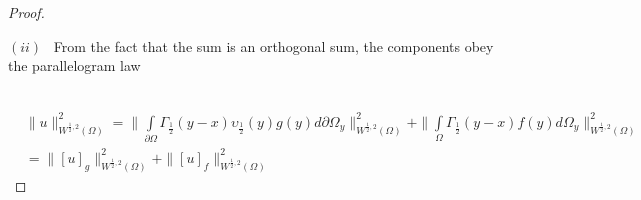 \documentclass[10pt,a4paper]{amsart}
\numberwithin{equation}{section}
\begin{document}
\begin{proof}
\ 

$\left(  ii\right)  $ \ From the fact that the sum is an orthogonal sum, the
components obey the parallelogram law

\
\begin{align*}
& \parallel u\parallel_{W^{\frac{1}{2},2}\left(  \Omega\right)  }%
^{2}=\parallel%
{\displaystyle\int\limits_{\partial\Omega}}
\Gamma_{\frac{1}{2}}\left(  y-x\right)  \upsilon_{\frac{1}{2}}\left(
y\right)  g(y)d\partial\Omega_{y}\parallel_{W^{\frac{1}{2},2}\left(
\Omega\right)  }^{2}+\parallel%
{\displaystyle\int\limits_{\Omega}}
\Gamma_{\frac{1}{2}}\left(  y-x\right)  f(y)d\Omega_{y}\parallel_{W^{\frac
{1}{2},2}\left(  \Omega\right)  }^{2}\\
& =\parallel\left[  u\right]  _{g}\parallel_{W^{\frac{1}{2},2}\left(
\Omega\right)  }^{2}+\parallel\left[  u\right]  _{f}\parallel_{W^{\frac{1}%
{2},2}\left(  \Omega\right)  }^{2}%
\end{align*}



\end{proof}
\end{document}
